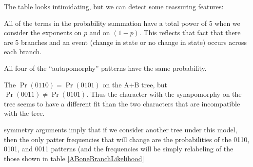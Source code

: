 \documentclass[11pt]{article}
\begin{document}
The table looks intimidating, but we can detect some reassuring features:
\begin{compactitem}
	\item All of the terms in the probability summation have a total power of 5 when we consider the exponents on $p$  and on $(1-p)$. This reflects that fact that there are 5 branches and an event (change in state or no change in state) occurs across each branch.
	\item All four of the ``autapomorphy'' patterns have the same probability.
	\item The $\Pr(0110) = \Pr(0101)$ on the A+B tree, but $\Pr(0011) \neq \Pr(0101)$.
	Thus the character with the synapomorphy on the tree seems to have a different fit than the two characters that are incompatible with the tree.
	\item  symmetry arguments imply that if we consider another tree under this model, then the only 
	patter frequencies that will change are the probabilities of the 0110, 0101, and 0011 patterns (and the frequencies will be simply relabeling of the those shown in table \ref{ABoneBranchLikelihood}
\end{compactitem}
\end{document}
